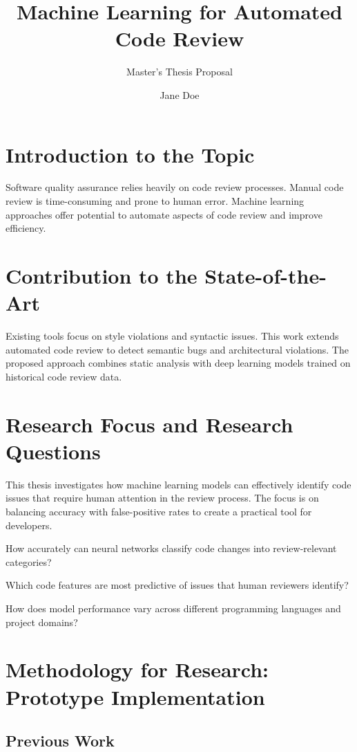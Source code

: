 \documentclass[usebib]{compactarticle}
\title{Machine Learning for Automated Code Review}
\author{Jane Doe}
\subtitle{Master's Thesis Proposal}
\begin{document}
\section{Introduction to the Topic}

Software quality assurance relies heavily on code review processes.
Manual code review is time-consuming and prone to human error.
Machine learning approaches offer potential to automate aspects of code review and improve efficiency.

\section{Contribution to the State-of-the-Art}

Existing tools focus on style violations and syntactic issues.
This work extends automated code review to detect semantic bugs and architectural violations.
The proposed approach combines static analysis with deep learning models trained on historical code review data.

\section{Research Focus and Research Questions}

This thesis investigates how machine learning models can effectively identify code issues that require human attention in the review process.
The focus is on balancing accuracy with false-positive rates to create a practical tool for developers.

\begin{RQs}
\item How accurately can neural networks classify code changes into review-relevant categories?
\item Which code features are most predictive of issues that human reviewers identify?
\item How does model performance vary across different programming languages and project domains?
\end{RQs}

\section{Methodology for Research: Prototype Implementation}

\subsection{Previous Work}
\end{document}
